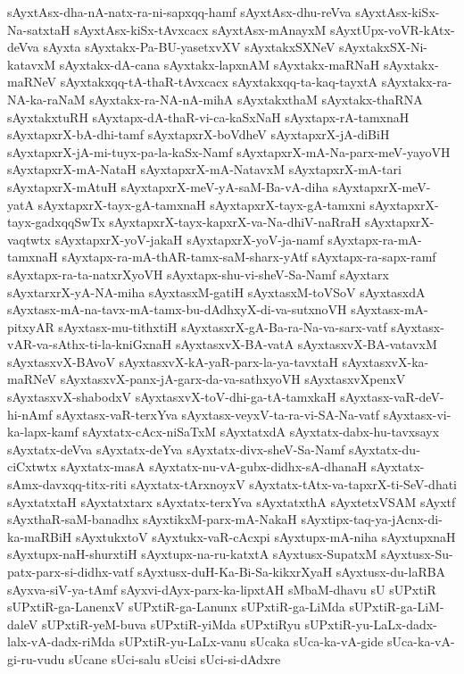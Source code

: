 {sAyxtAsx-dha-nA-natx-ra-ni-sapxqq-hamf
sAyxtAsx-dhu-reVva
sAyxtAsx-kiSx-Na-satxtaH
sAyxtAsx-kiSx-tAvxcacx
sAyxtAsx-mAnayxM
sAyxtUpx-voVR-kAtx-deVva
sAyxta
sAyxtakx-Pa-BU-yasetxvXV
sAyxtakxSXNeV
sAyxtakxSX-Ni-katavxM
sAyxtakx-dA-cana
sAyxtakx-lapxnAM
sAyxtakx-maRNaH
sAyxtakx-maRNeV
sAyxtakxqq-tA-thaR-tAvxcacx
sAyxtakxqq-ta-kaq-tayxtA
sAyxtakx-ra-NA-ka-raNaM
sAyxtakx-ra-NA-nA-mihA
sAyxtakxthaM
sAyxtakx-thaRNA
sAyxtakxtuRH
sAyxtapx-dA-thaR-vi-ca-kaSxNaH
sAyxtapx-rA-tamxnaH
sAyxtapxrX-bA-dhi-tamf
sAyxtapxrX-boVdheV
sAyxtapxrX-jA-diBiH
sAyxtapxrX-jA-mi-tuyx-pa-la-kaSx-Namf
sAyxtapxrX-mA-Na-parx-meV-yayoVH
sAyxtapxrX-mA-NataH
sAyxtapxrX-mA-NatavxM
sAyxtapxrX-mA-tari
sAyxtapxrX-mAtuH
sAyxtapxrX-meV-yA-saM-Ba-vA-diha
sAyxtapxrX-meV-yatA
sAyxtapxrX-tayx-gA-tamxnaH
sAyxtapxrX-tayx-gA-tamxni
sAyxtapxrX-tayx-gadxqqSwTx
sAyxtapxrX-tayx-kapxrX-va-Na-dhiV-naRraH
sAyxtapxrX-vaqtwtx
sAyxtapxrX-yoV-jakaH
sAyxtapxrX-yoV-ja-namf
sAyxtapx-ra-mA-tamxnaH
sAyxtapx-ra-mA-thAR-tamx-saM-sharx-yAtf
sAyxtapx-ra-sapx-ramf
sAyxtapx-ra-ta-natxrXyoVH
sAyxtapx-shu-vi-sheV-Sa-Namf
sAyxtarx
sAyxtarxrX-yA-NA-miha
sAyxtasxM-gatiH
sAyxtasxM-toVSoV
sAyxtasxdA
sAyxtasx-mA-na-tavx-mA-tamx-bu-dAdhxyX-di-va-sutxnoVH
sAyxtasx-mA-pitxyAR
sAyxtasx-mu-tithxtiH
sAyxtasxrX-gA-Ba-ra-Na-va-sarx-vatf
sAyxtasx-vAR-va-sAthx-ti-la-kniGxnaH
sAyxtasxvX-BA-vatA
sAyxtasxvX-BA-vatavxM
sAyxtasxvX-BAvoV
sAyxtasxvX-kA-yaR-parx-la-ya-tavxtaH
sAyxtasxvX-ka-maRNeV
sAyxtasxvX-panx-jA-garx-da-va-sathxyoVH
sAyxtasxvXpenxV
sAyxtasxvX-shabodxV
sAyxtasxvX-toV-dhi-ga-tA-tamxkaH
sAyxtasx-vaR-deV-hi-nAmf
sAyxtasx-vaR-terxYva
sAyxtasx-veyxV-ta-ra-vi-SA-Na-vatf
sAyxtasx-vi-ka-lapx-kamf
sAyxtatx-cAcx-niSaTxM
sAyxtatxdA
sAyxtatx-dabx-hu-tavxsayx
sAyxtatx-deVva
sAyxtatx-deYva
sAyxtatx-divx-sheV-Sa-Namf
sAyxtatx-du-ciCxtwtx
sAyxtatx-masA
sAyxtatx-nu-vA-gubx-didhx-sA-dhanaH
sAyxtatx-sAmx-davxqq-titx-riti
sAyxtatx-tArxnoyxV
sAyxtatx-tAtx-va-tapxrX-ti-SeV-dhati
sAyxtatxtaH
sAyxtatxtarx
sAyxtatx-terxYva
sAyxtatxthA
sAyxtetxVSAM
sAyxtf
sAyxthaR-saM-banadhx
sAyxtikxM-parx-mA-NakaH
sAyxtipx-taq-ya-jAcnx-di-ka-maRBiH
sAyxtukxtoV
sAyxtukx-vaR-cAcxpi
sAyxtupx-mA-niha
sAyxtupxnaH
sAyxtupx-naH-shurxtiH
sAyxtupx-na-ru-katxtA
sAyxtusx-SupatxM
sAyxtusx-Su-patx-parx-si-didhx-vatf
sAyxtusx-duH-Ka-Bi-Sa-kikxrXyaH
sAyxtusx-du-laRBA
sAyxva-siV-ya-tAmf
sAyxvi-dAyx-parx-ka-lipxtAH
sMbaM-dhavu
sU
sUPxtiR
sUPxtiR-ga-LanenxV
sUPxtiR-ga-Lanunx
sUPxtiR-ga-LiMda
sUPxtiR-ga-LiM-daleV
sUPxtiR-yeM-buva
sUPxtiR-yiMda
sUPxtiRyu
sUPxtiR-yu-LaLx-dadx-lalx-vA-dadx-riMda
sUPxtiR-yu-LaLx-vanu
sUcaka
sUca-ka-vA-gide
sUca-ka-vA-gi-ru-vudu
sUcane
sUci-salu
sUcisi
sUci-si-dAdxre
}
